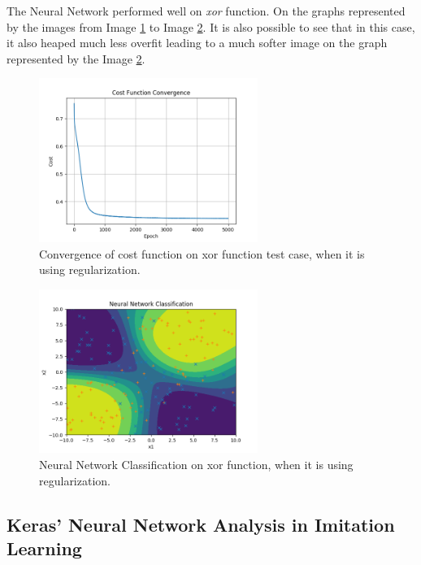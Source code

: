 \documentclass[journal]{IEEEtran}
\begin{document}
The Neural Network performed well on \textit{xor} function. On the graphs represented by the images from Image \ref{img:xor_cost_reg} to Image \ref{img:xor_classification_reg}. It is also possible to see that in this case, it also heaped much less overfit leading to a much softer image on the graph represented by the Image \ref{img:xor_classification_reg}.

\begin{figure}
  \begin{center}
  \includegraphics[width=2.8in]{./../code/xor_result/convergence_xor_l0_002.png}
  \caption{Convergence of cost function on xor function test case, when it is using regularization.}
  \label{img:xor_cost_reg}
  \end{center}
\end{figure}

\begin{figure}
    \begin{center}
    \includegraphics[width=2.8in]{./../code/xor_result/nn_classification_xor_l0_002.png}
    \caption{Neural Network Classification on xor function, when it is using regularization.}
    \label{img:xor_classification_reg}
    \end{center}
\end{figure}

\subsection{Keras' Neural Network Analysis in Imitation Learning}
\end{document}
